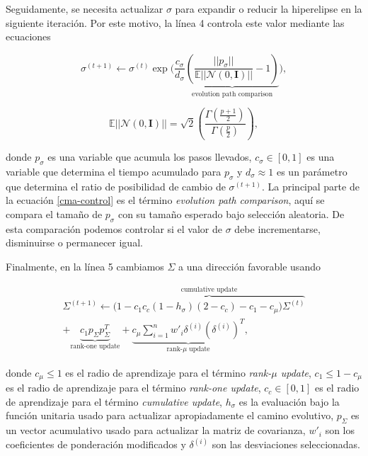 Seguidamente, se necesita actualizar $\sigma$ para expandir o reducir la
hiperelipse en la siguiente iteración. Por este motivo, la línea 4 controla
este valor mediante las ecuaciones

\begin{equation}
    \sigma^{(t + 1)} \gets \sigma^{(t)} \exp\bigg(\frac{c_{\sigma}}{d_{\sigma}}
    \underbrace{\left(\frac{||p_{\sigma}||}{\mathbb{E}||\mathcal{N}(0,
    \mathbf{I})||} - 1 \right)}_{\text{evolution path comparison}} \bigg),
\label{cma-control}
\end{equation}

\begin{equation}
\mathbb{E}||\mathcal{N}(0, \mathbf{I})|| = \sqrt{2} \left(
  \frac{\Gamma\left(\frac{p + 1}{2}\right)}{\Gamma\left({\frac{p}{2}}\right)}
  \right),
\label{cma-E}
\end{equation}

donde $p_{\sigma}$ es una variable que acumula los pasos llevados,
$c_{\sigma} \in [0, 1]$ es una variable que determina el tiempo acumulado para $p_{\sigma}$ y 
$d_{\sigma} \approx 1$ es un parámetro que determina el ratio de posibilidad de cambio de $\sigma^{(t + 1)}$. 
La principal parte de la ecuación \ref{cma-control} es el término \emph{evolution path comparison}, 
aquí se compara el tamaño de $p_{\sigma}$ con su tamaño esperado bajo selección
aleatoria.
De esta comparación podemos controlar si el valor de $\sigma$ debe
incrementarse, disminuirse o permanecer igual.

Finalmente, en la línea 5 cambiamos $\Sigma$ a una dirección favorable usando

\begin{multline}
    \Sigma^{(t + 1)} \gets \overbrace{\bigg(1 - c_1 c_c (1 - h_{\sigma})(2 - c_c) - c_1 - c_{\mu}\bigg) \Sigma^{(t)}}^{\text{cumulative update}} \\
    + \underbrace{c_{1} p_{\Sigma} p_{\Sigma}^{T}}_{\text{rank-one update}}
    + \underbrace{c_{\mu}\sum_{i=1}^{n}w'_{i}
    \delta^{(i)}\left(\delta^{(i)}\right)^{T}}_{\text{rank-}\mu\text{ update}},
\label{cma-adapt}
\end{multline}

donde $c_{\mu} \leq 1$ es el radio de aprendizaje para el término \emph{rank-$\mu$ update}, 
$c_1 \leq 1 - c_{\mu}$ es el radio de aprendizaje para el término \emph{rank-one update}, 
$c_c \in [0, 1]$ es el radio de aprendizaje para el término \emph{cumulative update}, 
$h_{\sigma}$ es la evaluación bajo la función unitaria usado para actualizar
apropiadamente el camino evolutivo, 
$p_{\Sigma}$ es un vector acumulativo usado para actualizar la matriz de
covarianza, 
$w'_i$ son los coeficientes de ponderación modificados y
$\delta^{(i)}$ son las desviaciones seleccionadas.

